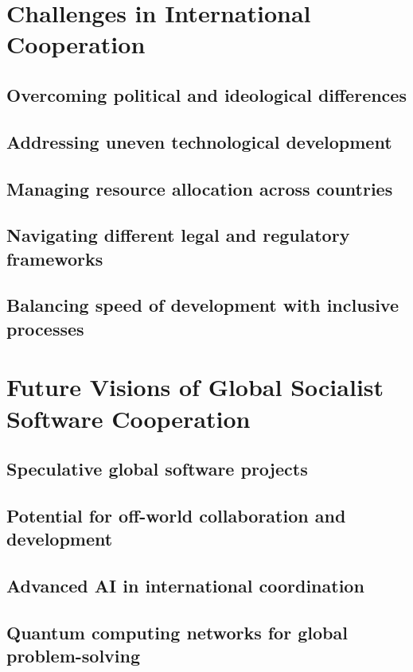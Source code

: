 \newpage

\section{Challenges in International Cooperation}
\subsection{Overcoming political and ideological differences}
\subsection{Addressing uneven technological development}
\subsection{Managing resource allocation across countries}
\subsection{Navigating different legal and regulatory frameworks}
\subsection{Balancing speed of development with inclusive processes}

\newpage

\section{Future Visions of Global Socialist Software Cooperation}
\subsection{Speculative global software projects}
\subsection{Potential for off-world collaboration and development}
\subsection{Advanced AI in international coordination}
\subsection{Quantum computing networks for global problem-solving}

